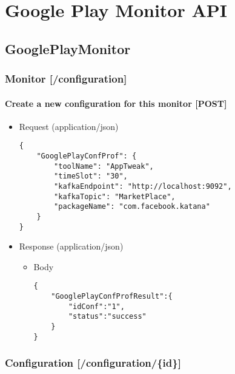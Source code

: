 
\chapter{Google Play Monitor API} %

\label{GooglePlayMonitor} %

\section{GooglePlayMonitor}\label{googleplaymonitor}

\subsection{Monitor {[}/configuration{]}}\label{monitor-configuration}

\subsubsection{Create a new configuration for this monitor
{[}POST{]}}\label{create-a-new-configuration-for-this-monitor-post}

\begin{itemize}
\item
  Request (application/json)

\begin{verbatim}
{
    "GooglePlayConfProf": {
        "toolName": "AppTweak",
        "timeSlot": "30",
        "kafkaEndpoint": "http://localhost:9092",
        "kafkaTopic": "MarketPlace",
        "packageName": "com.facebook.katana"
    }
}
\end{verbatim}
\item
  Response (application/json)

  \begin{itemize}
  \item
    Body

\begin{verbatim}
{
    "GooglePlayConfProfResult":{
        "idConf":"1",
        "status":"success"
    }
}
\end{verbatim}
  \end{itemize}
\end{itemize}

\subsection{Configuration
{[}/configuration/\{id\}{]}}\label{configuration-configurationid}

